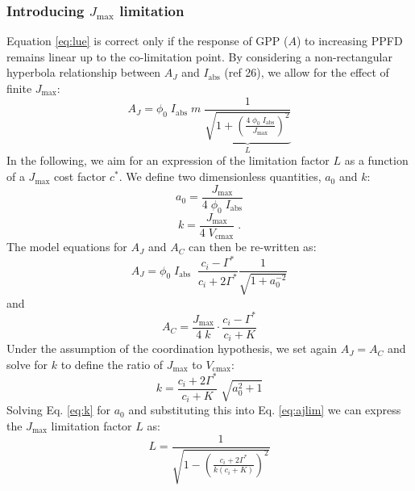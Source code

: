 \documentclass{myreport}
\begin{document}
\subsubsection{Introducing $J_{\mathrm{max}}$ limitation}
Equation \ref{eq:lue} is correct only if the response of GPP ($A$) to increasing PPFD remains linear up to the co-limitation point. 
By considering a non-rectangular hyperbola relationship between $A_J$ and $I_{\mathrm{abs}}$ (ref 26), we allow for the effect of finite $J_{\mathrm{max}}$:
\begin{equation}
\label{eq:ajlim}
    A_J = \phi_0 \; I_{\mathrm{abs}} \; m \; \underbrace{ \frac{1}{\sqrt{1+ \left( \frac{4\;\phi_0\;I_{\mathrm{abs}}}{J_{\mathrm{max}}} \right)^{2}}} }_{L}
\end{equation}
In the following, we aim for an expression of the limitation factor $L$ as a function of a $J_{\mathrm{max}}$ cost factor $c^{\ast}$. 
We define two dimensionless quantities, $a_0$ and $k$:
\begin{equation}
\label{eq:a0}
    a_0 = \frac{J_{\mathrm{max}}}{4\;\phi_0\;I_{\mathrm{abs}}}
\end{equation}
\begin{equation}
    k = \frac{J_{\mathrm{max}}}{4\;V_{\mathrm{cmax}}}\;.
\end{equation}
The model equations for $A_J$ and $A_C$ can then be re-written as:
\begin{equation}
\label{eq:ajlim2}
    A_J = \phi_0 \; I_{\mathrm{abs}} \; \; \frac{c_i - \Gamma^{\ast}}{c_i + 2\Gamma^{\ast}} \frac{1}{\sqrt{1+a_0^{-2}}}
\end{equation}
and
\begin{equation}
    A_C = \frac{J_{\mathrm{max}}}{4\;k} \cdot \frac{c_i - \Gamma^{\ast}}{c_i + K}
\end{equation}
Under the assumption of the coordination hypothesis, we set again $A_J = A_C$ and solve for $k$ to define the ratio of $J_{\mathrm{max}}$ to $V_{\mathrm{cmax}}$:
\begin{equation}
\label{eq:k}
    k = \frac{c_i + 2\Gamma^{\ast}}{c_i + K} \; \sqrt{a_0^2 + 1}
\end{equation}
Solving Eq. \ref{eq:k} for $a_0$ and substituting this into Eq. \ref{eq:ajlim} we can express the $J_{\mathrm{max}}$ limitation factor $L$ as:
\begin{equation}
\label{eq:ajlim3}
    L = \frac{1}{\sqrt{1 - \left( \frac{c_i+2\Gamma^{\ast}}{k(c_i+K)} \right)^{2}}}
\end{equation}
\end{document}
